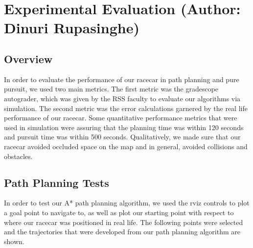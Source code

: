 \documentclass{article}
\begin{document}
\newpage
\section{Experimental Evaluation (Author: Dinuri Rupasinghe)}

\subsection{Overview}
In order to evaluate the performance of our racecar in path planning and pure pursuit, we used two main metrics. The first metric was the gradescope autograder, which was given by the RSS faculty to evaluate our algorithms via simulation. The second metric was the error calculations garnered by the real life performance of our racecar. Some quantitative performance metrics that were used in simulation were assuring that the planning time was within 120 seconds and pursuit time was within 500 seconds. Qualitatively, we made sure that our racecar avoided occluded space on the map and in general, avoided collisions and obstacles. 

\subsection{Path Planning Tests}
In order to test our A* path planning algorithm, we used the rviz controls to plot a goal point to navigate to, as well as plot our starting point with respect to where our racecar was positioned in real life. The following points were selected and the trajectories that were developed from our path planning algorithm are shown.\\
\end{document}
